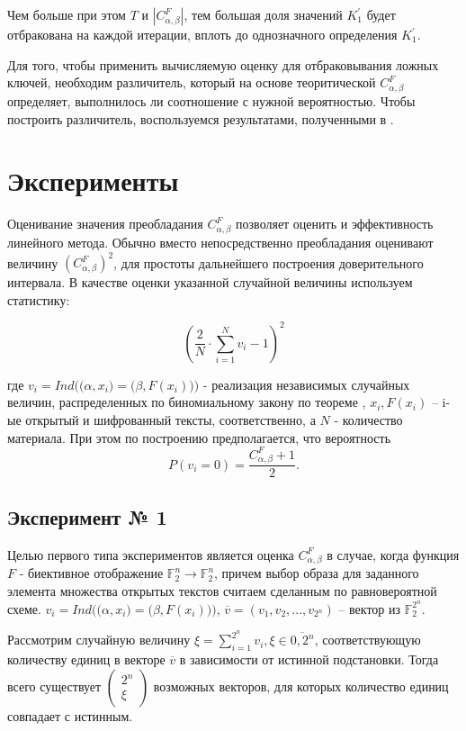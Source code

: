 \documentclass[utf8x, 14pt]{G7-32} %
\begin{document}
Чем больше при этом $T$ и $|C_{\alpha, \beta}^F|$, тем большая доля значений $K_1^{'}$ будет отбракована на каждой итерации, вплоть до однозначного определения $K_1^{'}$.

Для того, чтобы применить вычисляемую оценку для отбраковывания ложных ключей, необходим различитель, который на основе теоритической $C_{\alpha, \beta}^F$ определяет, выполнилось ли соотношение с нужной вероятностью. Чтобы построить различитель, воспользуемся результатами, полученными в \cite{main_paper}.

\chapter{Эксперименты}
Оценивание значения преобладания $C_{\alpha, \beta}^F$ позволяет оценить и эффективность линейного метода. Обычно вместо непосредственно преобладания оценивают величину $(C_{\alpha, \beta}^F)^2$, для простоты дальнейшего построения доверительного интервала. В качестве оценки указанной случайной величины используем статистику:

$$ \left(\dfrac{2}{N} \cdot \sum_{i = 1}^N v_i - 1\right)^2$$

где $ v_i = Ind\bigg(\big(\alpha, x_i\big) = \big(\beta, F(x_i)\big)\bigg) $ - реализация независимых случайных величин, распределенных по биномиальному закону по теореме \label{theorem}, $x_i, F(x_i)$ -- i-ые открытый и шифрованный тексты, соответственно, а $N$ - количество материала. При этом по построению предполагается, что вероятность $$P(v_i=0) = \dfrac{C_{\alpha, \beta}^F + 1}{2}. $$

\section{Эксперимент № 1}
Целью первого типа экспериментов является оценка $C_{\alpha, \beta}^F$ в случае, когда функция $F$ - биективное отображение $\mathbb{F}_2^n \to \mathbb{F}_2^n$, причем выбор образа для заданного элемента множества открытых текстов считаем сделанным по равновероятной схеме. $v_i = Ind\bigg(\big(\alpha, x_i\big) = \big(\beta, F(x_i)\big)\bigg)$, $ \overline{v} = (v_1, v_2,..., v_{2^n})$ -- вектор из $\mathbb{F}_2^{2^n}$. 

Рассмотрим случайную величину $\xi = \sum_{i = 1}^{2^n} v_i, \xi \in \overline{0, 2^n}$, соответствующую количеству единиц в векторе $\overline{v}$ в зависимости от истинной подстановки. Тогда всего существует $ \left( \begin{aligned} 2^n \\ \xi \end{aligned} \right) $ возможных векторов, для которых количество единиц совпадает с истинным. 
\end{document}
